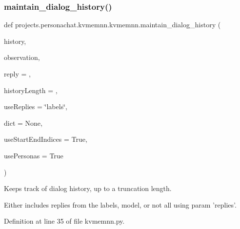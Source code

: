 \mbox{\label{namespaceprojects_1_1personachat_1_1kvmemnn_1_1kvmemnn_afe498b578d5df47bf521e2b38dd61605}} 
\subsubsection{\texorpdfstring{maintain\+\_\+dialog\+\_\+history()}{maintain\_dialog\_history()}}
{\footnotesize\ttfamily def projects.\+personachat.\+kvmemnn.\+kvmemnn.\+maintain\+\_\+dialog\+\_\+history (\begin{DoxyParamCaption}\item[{}]{history,  }\item[{}]{observation,  }\item[{}]{reply = {\ttfamily \textquotesingle{}\textquotesingle{}},  }\item[{}]{history\+Length = {},  }\item[{}]{use\+Replies = {\ttfamily \char`\"{}labels\char`\"{}},  }\item[{}]{dict = {\ttfamily None},  }\item[{}]{use\+Start\+End\+Indices = {\ttfamily True},  }\item[{}]{use\+Personas = {\ttfamily True} }\end{DoxyParamCaption})}

\begin{DoxyVerb}Keeps track of dialog history, up to a truncation length.

Either includes replies from the labels, model, or not all using param 'replies'.
\end{DoxyVerb}
 

Definition at line 35 of file kvmemnn.\+py.



